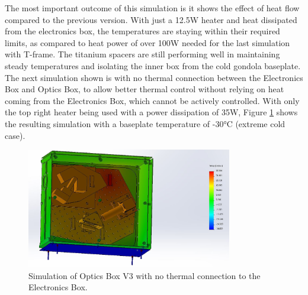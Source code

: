 The most important outcome of this simulation is it shows the effect of heat flow compared to the previous version. With just a 12.5W heater and heat dissipated from the electronics box, the temperatures are staying within their required limits, as compared to heat power of over 100W needed for the last simulation with T-frame. The titanium spacers are still performing well in maintaining steady temperatures and isolating the inner box from the cold gondola baseplate. The next simulation shown is with no thermal connection between the Electronics Box and Optics Box, to allow better thermal control without relying on heat coming from the Electronics Box, which cannot be actively controlled. With only the top right heater being used with a power dissipation of 35W, Figure \ref{fig:OB_V3_TA_2} shows the resulting simulation with a baseplate temperature of -30°C (extreme cold case).

\begin{figure}
    \centering
    \includegraphics[width=0.8\textwidth]{chap3_images/LIFE_V3_images/TA_-30_deg_35W_heater.JPG}
    \caption{Simulation of Optics Box V3 with no thermal connection to the Electronics Box.}
    \label{fig:OB_V3_TA_2}
\end{figure}

